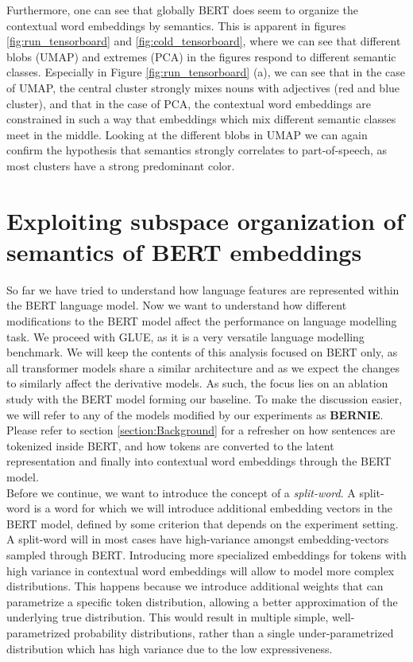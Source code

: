 \documentclass[a4paper,12pt,oneside,openright]{report}
\begin{document}
Furthermore, one can see that globally BERT does seem to organize the contextual word embeddings by semantics. 
This is apparent in figures \ref{fig:run_tensorboard} and \ref{fig:cold_tensorboard}, where we can see that different blobs (UMAP) and extremes (PCA) in the figures respond to different semantic classes.
Especially in Figure \ref{fig:run_tensorboard} (a), we can see that in the case of UMAP, the central cluster strongly mixes nouns with adjectives (red and blue cluster), and that in the case of PCA, the contextual word embeddings are constrained in such a way that embeddings which mix different semantic classes meet in the middle.
Looking at the different blobs in UMAP we can again confirm the hypothesis that semantics strongly correlates to part-of-speech, as most clusters have a strong predominant color. \\

\chapter{Exploiting subspace organization of semantics of BERT embeddings}\label{section:ExploitingBERT}


So far we have tried to understand how language features are represented within the BERT language model.
Now we want to understand how different modifications to the BERT model affect the performance on language modelling task.
We proceed with GLUE, as it is a very versatile language modelling benchmark.
We will keep the contents of this analysis focused on BERT only, as all transformer models share a similar architecture and as we expect the changes to similarly affect the derivative models.
As such, the focus lies on an ablation study with the BERT model  forming our baseline.
To make the discussion easier, we will refer to any of the models modified by our experiments as \textbf{BERNIE}. 
Please refer to section \ref{section:Background} for a refresher on how sentences are tokenized inside BERT, and how tokens are converted to the latent representation and finally into contextual word embeddings through the BERT model.
\\

Before we continue, we want to introduce the concept of a \textit{split-word}. A split-word is a word for which we will introduce additional embedding vectors in the BERT model, defined by some criterion that depends on the experiment setting.
A split-word will in most cases have high-variance amongst embedding-vectors sampled through BERT.
Introducing more specialized embeddings for tokens with high variance in contextual word embeddings will allow to model more complex distributions.
This happens because we introduce additional weights that can parametrize a specific token distribution, allowing a better approximation of the underlying true distribution.
This would result in multiple simple, well-parametrized probability distributions, rather than a single under-parametrized distribution which has high variance due to the low expressiveness.
\end{document}
